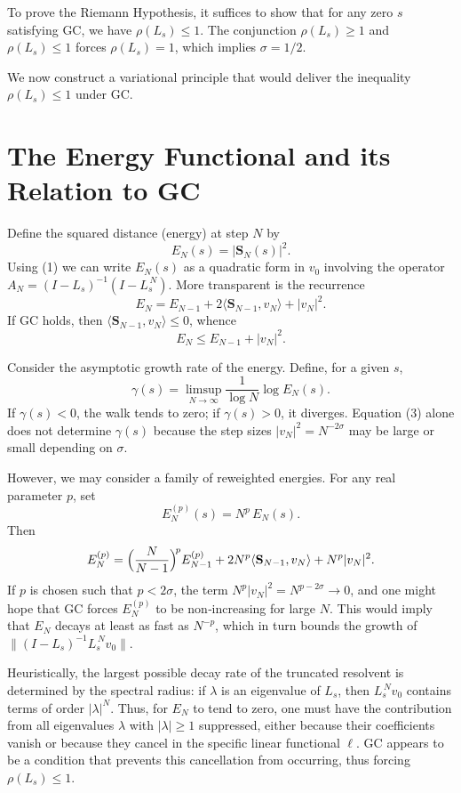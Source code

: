 \documentclass[11pt,a4paper]{article}
\begin{document}
To prove the Riemann Hypothesis, it suffices to show that for any zero $s$ satisfying GC, we have $\rho(L_s) \le 1$.  The conjunction $\rho(L_s) \ge 1$ and $\rho(L_s) \le 1$ forces $\rho(L_s) = 1$, which implies $\sigma = 1/2$.

We now construct a variational principle that would deliver the inequality $\rho(L_s) \le 1$ under GC.

\section{The Energy Functional and its Relation to GC}
Define the squared distance (energy) at step $N$ by
\[
E_N(s) = |\mathbf{S}_N(s)|^2.
\]
Using (1) we can write $E_N(s)$ as a quadratic form in $v_0$ involving the operator $A_N = (I - L_s)^{-1}(I - L_s^{\,N})$.  More transparent is the recurrence
\[
E_N = E_{N-1} + 2\langle \mathbf{S}_{N-1}, v_N \rangle + |v_N|^2.
\tag{2}
\]
If GC holds, then $\langle \mathbf{S}_{N-1}, v_N\rangle \le 0$, whence
\[
E_N \le E_{N-1} + |v_N|^2.
\tag{3}
\]

Consider the asymptotic growth rate of the energy.  Define, for a given $s$,
\[
\gamma(s) = \limsup_{N\to\infty} \frac{1}{\log N} \log E_N(s).
\]
If $\gamma(s) < 0$, the walk tends to zero; if $\gamma(s) > 0$, it diverges.  Equation (3) alone does not determine $\gamma(s)$ because the step sizes $|v_N|^2 = N^{-2\sigma}$ may be large or small depending on $\sigma$.

However, we may consider a family of reweighted energies.  For any real parameter $p$, set
\[
E_N^{(p)}(s) = N^{p}\, E_N(s).
\]
Then
\[
E_N^{(p)} = \Bigl(\frac{N}{N-1}\Bigr)^{\!p} E_{N-1}^{(p)} + 2 N^{p} \langle \mathbf{S}_{N-1}, v_N \rangle + N^{p} |v_N|^2.
\]
If $p$ is chosen such that $p < 2\sigma$, the term $N^{p}|v_N|^2 = N^{p-2\sigma} \to 0$, and one might hope that GC forces $E_N^{(p)}$ to be non‑increasing for large $N$.  This would imply that $E_N$ decays at least as fast as $N^{-p}$, which in turn bounds the growth of $\| (I - L_s)^{-1} L_s^{\,N} v_0\|$.

Heuristically, the largest possible decay rate of the truncated resolvent is determined by the spectral radius: if $\lambda$ is an eigenvalue of $L_s$, then $L_s^{\,N} v_0$ contains terms of order $|\lambda|^N$.  Thus, for $E_N$ to tend to zero, one must have the contribution from all eigenvalues $\lambda$ with $|\lambda| \ge 1$ suppressed, either because their coefficients vanish or because they cancel in the specific linear functional $\ell$.  GC appears to be a condition that prevents this cancellation from occurring, thus forcing $\rho(L_s) \le 1$.
\end{document}
